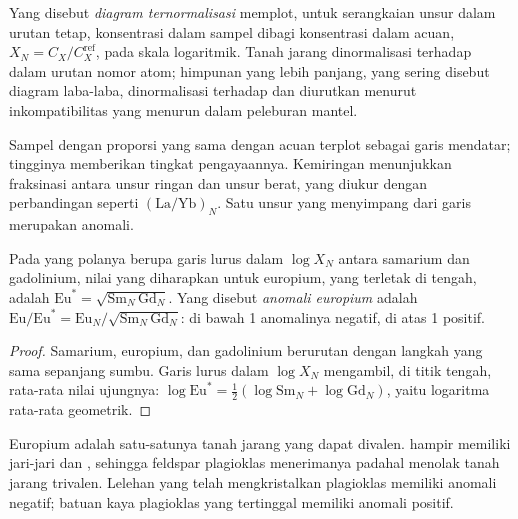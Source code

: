 \begin{definition}\label{def:b2:elements-in-the-earth:normalised}
Yang disebut \emph{diagram ternormalisasi} memplot, untuk serangkaian
unsur dalam urutan tetap, konsentrasi dalam sampel dibagi konsentrasi dalam
acuan, $X_N = C_X/C_X^{\mathrm{ref}}$, pada skala logaritmik. Tanah jarang
dinormalisasi terhadap  dalam urutan nomor atom; himpunan  yang lebih panjang, yang sering disebut diagram laba-laba, dinormalisasi terhadap
 dan diurutkan menurut inkompatibilitas yang menurun dalam peleburan mantel.
\end{definition}

Sampel dengan proporsi yang sama dengan acuan terplot sebagai garis mendatar;
tingginya memberikan tingkat pengayaannya. Kemiringan menunjukkan fraksinasi antara unsur ringan dan
unsur berat, yang diukur dengan perbandingan seperti $(\mathrm{La}/\mathrm{Yb})_N$. Satu
unsur yang menyimpang dari garis merupakan anomali.

\begin{proposition}\label{prop:b2:elements-in-the-earth:normalised}
Pada  yang polanya berupa garis lurus dalam
$\log X_N$ antara samarium dan gadolinium, nilai yang diharapkan untuk europium, yang
terletak di tengah, adalah $\mathrm{Eu}^* = \sqrt{\mathrm{Sm}_N\,\mathrm{Gd}_N}$. Yang disebut
\emph{anomali europium} adalah
$\mathrm{Eu}/\mathrm{Eu}^* = \mathrm{Eu}_N/\sqrt{\mathrm{Sm}_N\,\mathrm{Gd}_N}$:
di bawah 1 anomalinya negatif, di atas 1 positif.
\end{proposition}

\begin{proof}
Samarium, europium, dan gadolinium berurutan dengan langkah yang sama sepanjang sumbu.
Garis lurus dalam $\log X_N$ mengambil, di titik tengah, rata-rata nilai ujungnya:
$\log \mathrm{Eu}^* = \tfrac12(\log \mathrm{Sm}_N + \log \mathrm{Gd}_N)$, yaitu
logaritma rata-rata geometrik.
\end{proof}

Europium adalah satu-satunya tanah jarang yang dapat divalen.  hampir memiliki
jari-jari  dan , sehingga feldspar plagioklas menerimanya padahal
menolak tanah jarang trivalen. Lelehan yang telah mengkristalkan plagioklas
memiliki anomali negatif; batuan kaya plagioklas yang tertinggal memiliki anomali positif.

